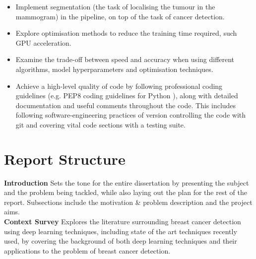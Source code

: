 \begin{itemize}
    \item Implement segmentation (the task of localising the tumour in the mammogram) in the pipeline, on top of the task of cancer detection.
    \item Explore optimisation methods to reduce the training time required, such  GPU acceleration.
    \item Examine the trade-off between speed and accuracy when using different algorithms, model hyperparameters and optimisation techniques.
    \item Achieve a high-level quality of code by following professional coding guidelines (e.g. PEP8 coding guidelines for Python \cite{pep8}), along with detailed documentation and useful comments throughout the code. This includes following software-engineering practices of version controlling the code with git and covering vital code sections with a testing suite.
\end{itemize}


\section{Report Structure}

\tab \textbf{Introduction} \space Sets the tone for the entire dissertation by presenting the subject and the problem being tackled, while also laying out the plan for the rest of the report. Subsections include the motivation \& problem description and the project aims.\\

\textbf{Context Survey} \space
Explores the literature surrounding breast cancer detection using deep learning techniques, including state of the art techniques recently used, by covering the background of both deep learning techniques and their applications to the problem of breast cancer detection.\\

